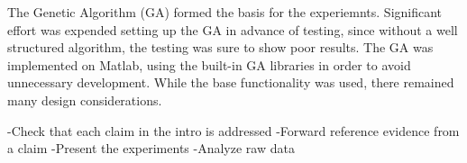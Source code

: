 The Genetic Algorithm (GA) formed the basis for the experiemnts. Significant effort was expended setting up the GA in advance of testing, since without a well structured algorithm, the testing was sure to show poor results. The GA was implemented on Matlab, using the built-in GA libraries in order to avoid unnecessary development. While the base functionality was used, there remained many design considerations.

-Check that each claim in the intro is addressed
-Forward reference evidence from a claim
-Present the experiments
-Analyze raw data